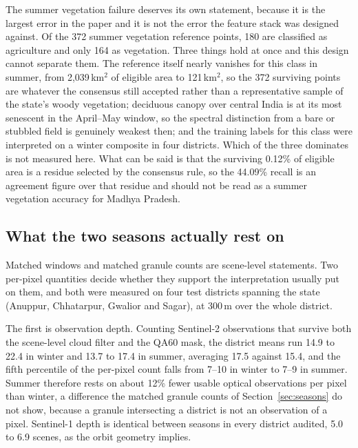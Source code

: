 \documentclass[conference]{IEEEtran}
\begin{document}
The summer vegetation failure deserves its own statement, because it is the largest error in the paper and it is not the error the feature stack was designed against. Of the 372 summer vegetation reference points, 180 are classified as agriculture and only 164 as vegetation. Three things hold at once and this design cannot separate them. The reference itself nearly vanishes for this class in summer, from 2,039\,km$^2$ of eligible area to 121\,km$^2$, so the 372 surviving points are whatever the consensus still accepted rather than a representative sample of the state's woody vegetation; deciduous canopy over central India is at its most senescent in the April--May window, so the spectral distinction from a bare or stubbled field is genuinely weakest then; and the training labels for this class were interpreted on a winter composite in four districts. Which of the three dominates is not measured here. What can be said is that the surviving 0.12\% of eligible area is a residue selected by the consensus rule, so the 44.09\% recall is an agreement figure over that residue and should not be read as a summer vegetation accuracy for Madhya Pradesh.

\subsection{What the two seasons actually rest on}
\label{sec:seasonal_support}
Matched windows and matched granule counts are scene-level statements. Two per-pixel quantities decide whether they support the interpretation usually put on them, and both were measured on four test districts spanning the state (Anuppur, Chhatarpur, Gwalior and Sagar), at 300\,m over the whole district.

The first is observation depth. Counting Sentinel-2 observations that survive both the scene-level cloud filter and the QA60 mask, the district means run 14.9 to 22.4 in winter and 13.7 to 17.4 in summer, averaging 17.5 against 15.4, and the fifth percentile of the per-pixel count falls from 7--10 in winter to 7--9 in summer. Summer therefore rests on about 12\% fewer usable optical observations per pixel than winter, a difference the matched granule counts of Section~\ref{sec:seasons} do not show, because a granule intersecting a district is not an observation of a pixel. Sentinel-1 depth is identical between seasons in every district audited, 5.0 to 6.9 scenes, as the orbit geometry implies.
\end{document}
